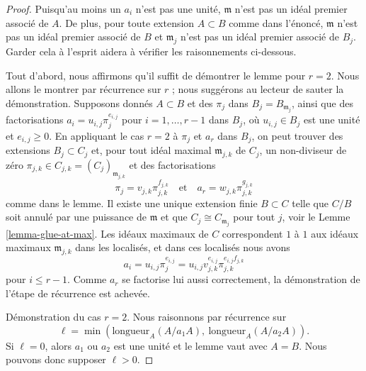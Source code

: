 \begin{proof}
Puisqu'au moins un $a_i$ n'est pas une unité, $\mathfrak m$
n'est pas un idéal premier associé de $A$. De plus, pour toute extension $A \subset B$
comme dans l'énoncé, $\mathfrak m$ n'est pas un idéal premier associé de $B$
et $\mathfrak m_j$ n'est pas un idéal premier associé de $B_j$.
Garder cela à l'esprit aidera à vérifier les raisonnements ci-dessous.

\medskip\noindent
Tout d'abord, nous affirmons qu'il suffit de démontrer le lemme pour $r = 2$.
Nous allons le montrer par récurrence sur $r$ ; nous suggérons au lecteur
de sauter la démonstration. Supposons donnés $A \subset B$ et des $\pi_j$ dans
$B_j = B_{\mathfrak m_j}$, ainsi que des factorisations
$a_i = u_{i, j} \pi_j^{e_{i, j}}$ pour $i = 1, \ldots, r - 1$ dans $B_j$,
où $u_{i, j} \in B_j$ est une unité et $e_{i, j} \geq 0$.
En appliquant le cas $r = 2$ à $\pi_j$ et $a_r$ dans $B_j$,
on peut trouver des extensions $B_j \subset C_j$ et, pour tout idéal maximal
$\mathfrak m_{j, k}$ de $C_j$, un non-diviseur de zéro
$\pi_{j, k} \in C_{j, k} = (C_j)_{\mathfrak m_{j, k}}$
et des factorisations
$$
\pi_j = v_{j, k} \pi_{j, k}^{f_{j, k}}
\quad\text{et}\quad
a_r = w_{j, k} \pi_{j, k}^{g_{j, k}}
$$
comme dans le lemme. Il existe une unique extension finie $B \subset C$
telle que $C/B$ soit annulé par une puissance de $\mathfrak m$ et
que $C_j \cong C_{\mathfrak m_j}$ pour tout $j$, voir
le Lemme \ref{lemma-glue-at-max}.
Les idéaux maximaux de $C$ correspondent $1$ à $1$
aux idéaux maximaux $\mathfrak m_{j, k}$ dans les localisés,
et dans ces localisés nous avons
$$
a_i = u_{i, j} \pi_j^{e_{i, j}} =
u_{i, j} v_{j, k}^{e_{i, j}} \pi_{j, k}^{e_{i, j}f_{j, k}}
$$
pour $i \leq r - 1$. Comme $a_r$ se factorise lui aussi correctement, la
démonstration de l'étape de récurrence est achevée.

\medskip\noindent
Démonstration du cas $r = 2$. Nous raisonnons par récurrence sur
$$
\ell = \min(\text{longueur}_A(A/a_1A),\ \text{longueur}_A(A/a_2A)).
$$
Si $\ell = 0$, alors $a_1$ ou $a_2$ est une unité et
le lemme vaut avec $A = B$. Nous pouvons donc supposer $\ell > 0$.


\end{proof}
